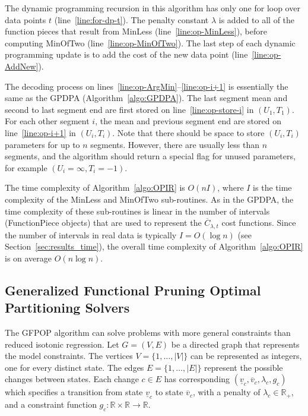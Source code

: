 \documentclass{article}
\newcommand{\RR}{\mathbb R}
\begin{document}
The dynamic programming recursion in this algorithm has only one for
loop over data points $t$ (line~\ref{line:for-dp-t}). The penalty
constant $\lambda$ is added to all of the function pieces that result
from MinLess (line~\ref{line:op-MinLess}), before computing MinOfTwo
(line~\ref{line:op-MinOfTwo}). The last step of each dynamic
programming update is to add the cost of the new data point
(line~\ref{line:op-AddNew}).

The decoding process on lines~\ref{line:op-ArgMin}--\ref{line:op-i+1}
is essentially the same as the GPDPA (Algorithm~\ref{algo:GPDPA}). The
last segment mean and second to last segment end are first stored on
line~\ref{line:op-store-i} in $(U_1,T_1)$. For each other segment $i$,
the mean and previous segment end are stored on line~\ref{line:op-i+1}
in $(U_i,T_i)$. Note that there should be space to store $(U_i,T_i)$
parameters for up to $n$ segments. However, there are usually less
than $n$ segments, and the algorithm should return a special flag for
unused parameters, for example $(U_i=\infty, T_i=-1)$.

The time complexity of Algorithm~\ref{algo:OPIR} is $O(n I)$, where
$I$ is the time complexity of the MinLess and MinOfTwo
sub-routines. As in the GPDPA, the time complexity of these
sub-routines is linear in the number of intervals (FunctionPiece
objects) that are used to represent the $\overline C_{\lambda, t}$
cost functions. Since the number of intervals in real data is
typically $I=O(\log n)$ (see Section~\ref{sec:results_time}), the
overall time complexity of Algorithm~\ref{algo:OPIR} is on average
$O(n \log n)$.

\subsection{Generalized Functional Pruning Optimal Partitioning
  Solvers}
\label{sec:GFPOP}

The GFPOP algorithm can solve problems with more general constraints
than reduced isotonic regression. Let $G=(V,E)$ be a directed graph
that represents the model constraints. The vertices
$V=\{1,\dots,|V|\}$ can be represented as integers, one for every
distinct state. The edges $E=\{1,\dots,|E|\}$ represent the possible
changes between states. Each change $c\in E$ has corresponding
$(\underline v_c, \overline v_c, \lambda_c, g_c)$ which specifies a
transition from state $\underline v_c$ to state $\overline v_c$, with
a penalty of $\lambda_c\in\RR_+$, and a constraint function
$g_c:\RR\times\RR\rightarrow\RR$. 
\end{document}
